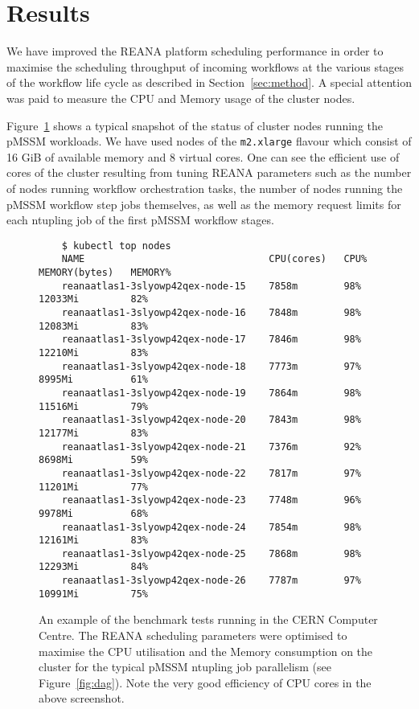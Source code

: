 \section{Results}\label{sec:results}

We have improved the REANA platform scheduling performance in order to maximise the scheduling throughput of incoming workflows at the various stages of the workflow life cycle as described in Section~\ref{sec:method}.
A special attention was paid to measure the CPU and Memory usage of the cluster nodes.

Figure~\ref{fig:testnodes} shows a typical snapshot of the status of cluster nodes running the pMSSM workloads.
We have used nodes of the \texttt{m2.xlarge} flavour which consist of 16 GiB of available memory and 8 virtual cores.
One can see the efficient use of cores of the cluster resulting from tuning REANA parameters such as the number of nodes running workflow orchestration tasks, the number of nodes running the pMSSM workflow step jobs themselves, as well as the memory request limits for each ntupling job of the first pMSSM workflow stages.

\begin{figure}
\centering
\footnotesize
\begin{verbatim}
    $ kubectl top nodes
    NAME                                CPU(cores)   CPU%   MEMORY(bytes)   MEMORY%
    reanaatlas1-3slyowp42qex-node-15    7858m        98%    12033Mi         82%
    reanaatlas1-3slyowp42qex-node-16    7848m        98%    12083Mi         83%
    reanaatlas1-3slyowp42qex-node-17    7846m        98%    12210Mi         83%
    reanaatlas1-3slyowp42qex-node-18    7773m        97%    8995Mi          61%
    reanaatlas1-3slyowp42qex-node-19    7864m        98%    11516Mi         79%
    reanaatlas1-3slyowp42qex-node-20    7843m        98%    12177Mi         83%
    reanaatlas1-3slyowp42qex-node-21    7376m        92%    8698Mi          59%
    reanaatlas1-3slyowp42qex-node-22    7817m        97%    11201Mi         77%
    reanaatlas1-3slyowp42qex-node-23    7748m        96%    9978Mi          68%
    reanaatlas1-3slyowp42qex-node-24    7854m        98%    12161Mi         83%
    reanaatlas1-3slyowp42qex-node-25    7868m        98%    12293Mi         84%
    reanaatlas1-3slyowp42qex-node-26    7787m        97%    10991Mi         75%
\end{verbatim}
\caption{An example of the benchmark tests running in the CERN Computer Centre.
The REANA scheduling parameters were optimised to maximise the CPU utilisation and the Memory consumption on the cluster for the typical pMSSM ntupling job parallelism (see Figure~\ref{fig:dag}).
Note the very good efficiency of CPU cores in the above screenshot.}
\label{fig:testnodes}
\end{figure}

